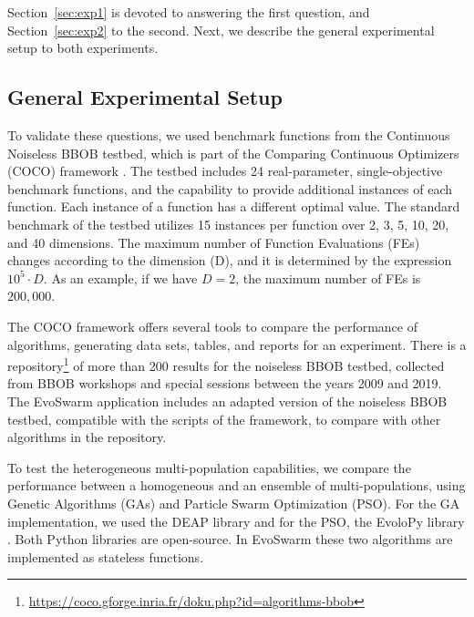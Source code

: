 \documentclass[review]{elsarticle}
\begin{document}
Section~\ref{sec:exp1} is devoted to answering the first question, and Section~\ref{sec:exp2} to the second.
Next, we describe the general experimental setup to both experiments.

\subsection{General Experimental Setup} 
\label{sec:general-setup} 

To validate these questions, we used benchmark functions from the Continuous
Noiseless BBOB testbed, which is part of the Comparing Continuous Optimizers
(COCO) framework \cite{hansen2016coco}. The testbed includes 24 real-parameter,
single-objective benchmark functions, and the capability to provide additional
instances of each function. Each instance of a function has a different optimal
value. The standard benchmark of the testbed utilizes 15 instances per function
over 2, 3, 5, 10, 20, and 40 dimensions. The maximum number of Function
Evaluations (FEs) changes according to the dimension (D), and it is determined
by the expression $10^5 \cdot D$. As an example, if we have $D = 2$, the
maximum number of FEs is $200,000$.

The COCO framework offers several tools to compare the performance of
algorithms, generating data sets, tables, and reports for an experiment. There
is a repository\footnote{\url{https://coco.gforge.inria.fr/doku.php?id=algorithms-bbob}} 
of more than 200 results for the noiseless BBOB testbed, collected from 
BBOB workshops and special sessions between the years 2009 and 2019. The
EvoSwarm application includes an adapted version of the noiseless BBOB testbed,
compatible with the scripts of the framework, to compare with other algorithms
in the repository.

To test the heterogeneous multi-population capabilities,  we compare the
performance between a homogeneous and an ensemble of multi-populations, using
Genetic Algorithms (GAs) and Particle Swarm Optimization (PSO). For the GA
implementation, we used the DEAP library \cite{fortin2012deap} and for the PSO,
the EvoloPy library \cite{faris2016evolopy}. Both Python libraries are
open-source. In EvoSwarm these two algorithms are implemented as stateless
functions.
\end{document}
